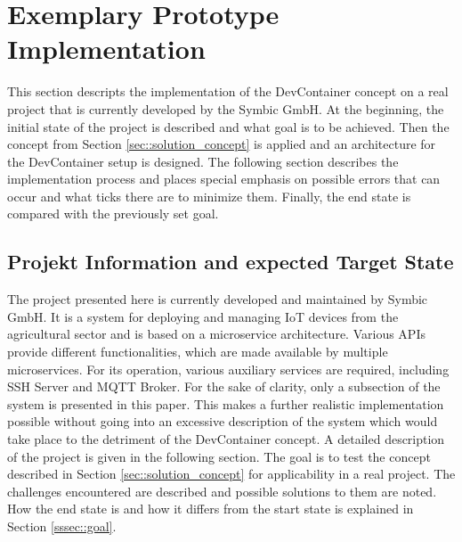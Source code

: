 \documentclass[12pt, a4paper]{article}
\begin{document}
\section{Exemplary Prototype Implementation}\label{sec::solution_code}
This section descripts the implementation of the DevContainer concept on a real project that is currently developed by the Symbic GmbH. At the beginning, the initial state of the project is described and what goal is to be achieved. Then the concept from Section \ref{sec::solution_concept} is applied and an architecture for the DevContainer setup is designed. The following section describes the implementation process and places special emphasis on possible errors that can occur and what ticks there are to minimize them. Finally, the end state is compared with the previously set goal.

    \subsection{Projekt Information and expected Target State}
    The project presented here is currently developed and maintained by Symbic GmbH. It is a system for deploying and managing \ac{IoT} devices from the agricultural sector and is based on a microservice architecture. Various \ac{API}s provide different functionalities, which are made available by multiple microservices. For its operation, various auxiliary services are required, including SSH Server and MQTT Broker. For the sake of clarity, only a subsection of the system is presented in this paper. This makes a further realistic implementation possible without going into an excessive description of the system which would take place to the detriment of the DevContainer concept. A detailed description of the project is given in the following section. \newline
    The goal is to test the concept described in Section \ref{sec::solution_concept} for applicability in a real project. The challenges encountered are described and possible solutions to them are noted. How the end state is and how it differs from the start state is explained in Section \ref{sssec::goal}.
\end{document}
